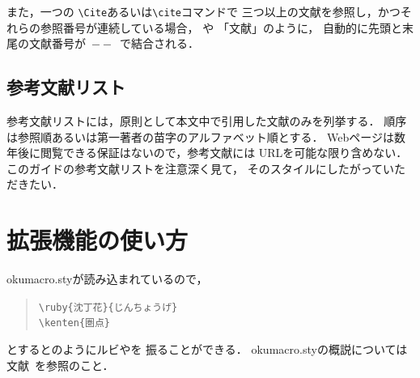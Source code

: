 \documentclass[a4j, 9pt, twocolumn, twoside]{jsarticle}
\begin{document}
また，一つの \verb+\Cite+あるいは\verb+\cite+コマンドで
三つ以上の文献を参照し，かつそれらの参照番号が連続している場合，
\Cite{latex, bibunsho, jinko}や
「文献\cite{latex, bibunsho, jinko}」のように，
自動的に先頭と末尾の文献番号が\ $--$\ で結合される．

\subsection{参考文献リスト}
参考文献リストには，原則として本文中で引用した文献のみを列挙する．
順序は参照順あるいは第一著者の苗字のアルファベット順とする．
Webページは数年後に閲覧できる保証はないので，参考文献には
URLを可能な限り含めない．
このガイドの参考文献リストを注意深く見て，
そのスタイルにしたがっていただきたい．

\section{拡張機能の使い方}
okumacro.styが読み込まれているので，
\begin{quote}\small
\verb+\ruby{沈丁花}{じんちょうげ}+\\
\verb+\kenten{圏点}+
\end{quote}
とするとのようにルビやを
振ることができる．
okumacro.styの概説については文献~\Cite{bibunsho}を参照のこと．

\begin{thebibliography}{9}
\end{thebibliography}
\end{document}
